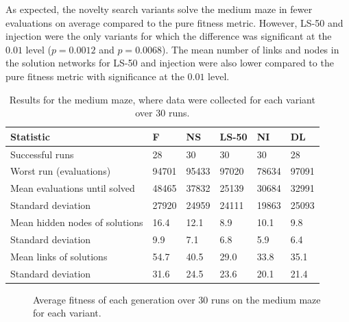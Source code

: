 As expected, the novelty search variants solve the medium maze in fewer evaluations on average
compared to the pure fitness metric. However, LS-50 and injection were the only variants for which
the difference was significant at the $0.01$ level ($p=0.0012$ and $p=0.0068$). The mean number of
links and nodes in the solution networks for LS-50 and injection were also lower
compared to the pure fitness metric with significance at the $0.01$ level.

\begin{table}[H]
    \centering
    \begin{tabular}{llllll}
    \toprule
    Statistic & \multicolumn{1}{l}{F} & \multicolumn{1}{l}{NS} & \multicolumn{1}{l}{LS-50} & \multicolumn{1}{l}{NI} & \multicolumn{1}{l}{DL} \\
    \midrule
    Successful runs & 28 & 30 & 30 & 30 & 28 \\
    Worst run (evaluations) & 94701 & 95433 & 97020 & 78634 & 97091 \\
    \rowcolor[gray]{.9} Mean evaluations until solved & 48465 & 37832 & 25139 & 30684 & 32991 \\
    Standard deviation & 27920  & 24959 & 24111 & 19863 & 25093 \\
    \rowcolor[gray]{.9} Mean hidden nodes of solutions & 16.4 & 12.1  & 8.9  & 10.1 & 9.8 \\
    Standard deviation & 9.9 & 7.1 & 6.8 & 5.9 & 6.4 \\
    \rowcolor[gray]{.9} Mean links of solutions & 54.7  & 40.5 & 29.0 & 33.8 & 35.1 \\
    Standard deviation & 31.6  & 24.5 & 23.6 & 20.1 & 21.4\\
    \bottomrule
    \end{tabular}
    \caption{Results for the medium maze, where data were collected for each variant over 30 runs.}
    \label{medium}
\end{table}

\begin{figure}[H]
    \begin{center}
        
    \end{center}
    \caption{Average fitness of each generation over 30 runs on the medium maze for each variant.}
    \label{medium_fitness}
\end{figure}

